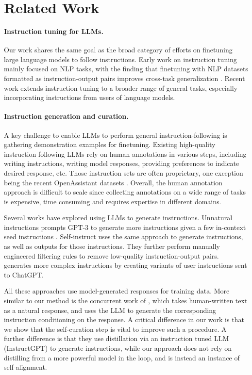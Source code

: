 \section{Related Work}

\paragraph{Instruction tuning for LLMs.} Our work shares the same goal as the broad category of efforts on finetuning large language models to follow instructions. Early work on instruction tuning mainly focused on NLP tasks, with the finding that finetuning with NLP datasets formatted as instruction-output pairs improves cross-task generalization \citep{wei2021finetuned,mishra2021cross,sanh2021multitask,wang2022super}. Recent work \citet{ouyang2022training} extends instruction tuning to a broader range of general tasks, especially incorporating instructions from users of language models.

\vspace{-2mm}
\paragraph{Instruction generation and curation.} A key challenge to enable LLMs to perform general instruction-following is gathering demonstration examples for finetuning. Existing high-quality instruction-following LLMs rely on human annotations in various steps, including writing instructions, writing model responses, providing preferences to indicate desired response, etc. Those instruction sets are often proprietary, one exception being the recent OpenAssistant datasets \citep{kopf2023openassistant}. Overall, the human annotation approach is difficult to scale since collecting annotations on a wide range of tasks is expensive, time consuming and requires expertise in different domains. 

Several works have explored using LLMs to generate instructions. Unnatural instructions prompts GPT-3 to generate more instructions given a few in-context seed instructions \citep{honovich2022unnatural}. Self-instruct \citep{wang2022self} uses the same approach to generate instructions, as well as outputs for those instructions. They further perform manually engineered filtering rules to remove low-quality instruction-output pairs. \citet{xu2023wizardlm} generates more complex instructions by creating variants of user instructions sent to ChatGPT.  

All these approaches use model-generated responses for training data. More similar to our method is the concurrent work  of \citet{koksal2023longform}, which takes human-written text as a natural response, and uses the LLM to generate the corresponding instruction conditioning on the response. A critical difference in our work is that we show that the self-curation step is vital to improve such a procedure.
A further difference is that they use distillation via an instruction tuned LLM (InstructGPT) to generate instructions, while our approach does not rely on distilling from a more powerful model in the loop, and is instead an instance of self-alignment. 
\vspace{-2mm}
